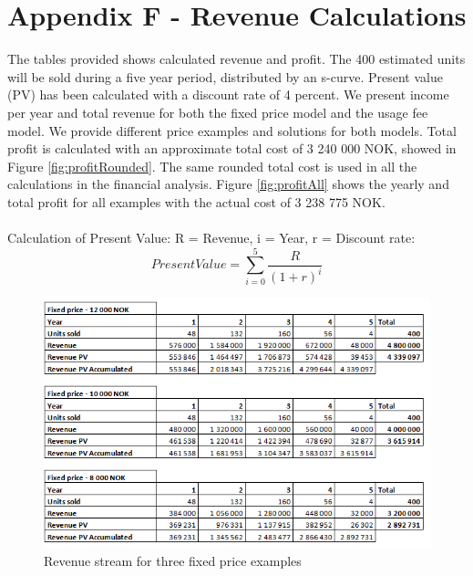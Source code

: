 \newpage
\section*{Appendix F - Revenue Calculations}
\label{F}

The tables provided shows calculated revenue and profit. The 400 estimated units will be sold during a five year period, distributed by an s-curve. Present value (PV) has been calculated with a discount rate of 4 percent. We present income per year and total revenue for both the fixed price model and the usage fee model. We provide different price examples and solutions for both models. Total profit is calculated with an approximate total cost of 3 240 000 NOK, showed in Figure \ref{fig:profitRounded}. The same rounded total cost is used in all the calculations in the financial analysis. Figure \ref{fig:profitAll} shows the yearly and total profit for all examples with the actual cost of  3 238 775 NOK. \\ \\
Calculation of Present Value:
R = Revenue,
i = Year,
r = Discount rate:
\begin{equation}
Present Value = \sum_{i=0}^{5} \frac{R}{(1+r)^i}
\end{equation}

\bigskip
\bigskip
\bigskip
\bigskip
\bigskip
\bigskip
\bigskip
\bigskip
\bigskip
\bigskip
\bigskip
\bigskip

\begin{figure}
\begin{center}
\includegraphics[scale=0.8]{revenuepvappendixfixed}
\caption{Revenue stream for three fixed price examples}
\label{fig:revenueFixed}
\end{center}
\end{figure}


